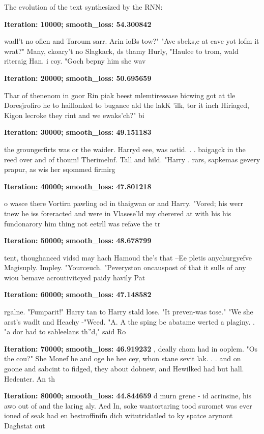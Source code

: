 \documentclass[12pt]{article}
\newenvironment{question}[2][Question]{\begin{trivlist}
\kern10pt
\item[\hskip \labelsep {\bfseries #1}\hskip \labelsep {\bfseries #2.}]}{\end{trivlist}}
\begin{document}
\begin{question}{iii}
The evolution of the text synthesized by the RNN:

\textbf{Iteration: 10000; smooth\_loss: 54.300842}

wadl't no oflen and Taroum sarr.  Arin ioBs tow?"
"Ave sbeks,e at cave yot lofm it wrat?"
Many, ckoary't no Slagkack, ds thamy Hurly, "Haulce to trom, wald riteraig Han. i coy.
"Goch bepny him she wav

\textbf{Iteration: 20000; smooth\_loss: 50.695659} 

Thar of thenenom in goor Rin piak beest mlemtiresease bicwing got at tle Doresjrofiro he to haillonked to bugance ald the lakK 'ilk, tor it inch Hiriaged, Kigon lecroke they rint and we ewaks'ch?"  bi

\textbf{Iteration: 30000; smooth\_loss: 49.151183} 

the groungerfirts was or the waider.  Harryd eee, was astid. . . baigagck in the reed over and of thoum!  Therimelnf.  Tall and hild.  "Harry . rars, sapkemas gevery prapur, as wis her sqommed firmirg

\textbf{Iteration: 40000; smooth\_loss: 47.801218} 

o wasce there Vortirn pawling od in thaigwan or and Harry.
"Vored; his werr tnew he iss foreracted and were in Vlasese'ld my cherered at with his his fundonarory him thing not eetrll was refave the tr

\textbf{Iteration: 50000; smooth\_loss: 48.678799} 

tent, thoughanced vidsd may hach Hamoud the's that --Ee pletis anychurgyefve Magisuply.  Impley.  "Yourceuch.
"Peveryston oncauspost of that it sulls of any wiou bemave acroutivitcyed paidy havily Pat

\textbf{Iteration: 60000; smooth\_loss: 47.148582} 

rgalne.
"Fumparit!" Harry tan to Harry stald lose.
"It preven-was tose."
"We she arst's wadlt and Heachy -"Weed.
"A. A the sping be abatame werted a plaginy. .
"a dor had to sableelans th''d," said Ro

\textbf{Iteration: 70000; smooth\_loss: 46.919232} 
, deally chom had in ooplem.
"Os the cou?" She Monef he and oge he hee cey, whon stane sevit lak. . . and on goone and sabcint to fidged, they about dobnew, and Hewilked had but hall.
Hedenter.  An th


\textbf{Iteration: 80000; smooth\_loss: 44.844659} 
d murn grene - id acrinsine, his awo out of and the laring aly.  Aed In, soke wantortaring tood suromet was ever ioned of seak had en bestroffinifn dich witutridatled to ky spatce arynont Daghstat out


\end{question}
\end{document}
